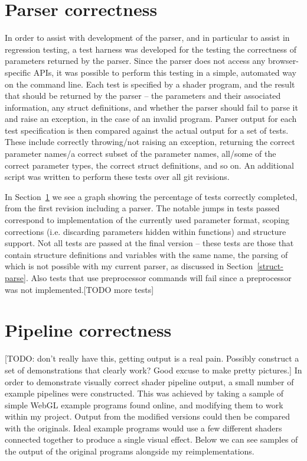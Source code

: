 \documentclass[12pt,twoside,notitlepage]{report}
\begin{document}
\section{Parser correctness}
In order to assist with development of the parser, and in particular to assist in regression testing, a test harness was developed for the testing the correctness of parameters returned by the parser. Since the parser does not access any browser-specific APIs, it was possible to perform this testing in a simple, automated way on the command line. Each test is specified by a shader program, and the result that should be returned by the parser -- the parameters and their associated information, any struct definitions, and whether the parser should fail to parse it and raise an exception, in the case of an invalid program. Parser output for each test specification is then compared against the actual output for a set of tests. These include correctly throwing/not raising an exception, returning the correct parameter names/a correct subset of the parameter names, all/some of the correct parameter types, the correct struct definitions, and so on. An additional script was written to perform these tests over all git revisions. 

In Section~\ref{parser-git} we see a graph showing the percentage of tests correctly completed, from the first revision including a parser. The notable jumps in tests passed correspond to implementation of the currently used parameter format, scoping corrections (i.e. discarding parameters hidden within functions) and structure support. Not all tests are passed at the final version -- these tests are those that contain structure definitions and variables with the same name, the parsing of which is not possible with my current parser, as discussed in Section~\ref{struct-parse}. Also tests that use preprocessor commands will fail since a preprocessor was not implemented.[TODO more tests]

\begin{figure}
\label{parser-git}
\end{figure}

\section{Pipeline correctness}
[TODO: don't really have this, getting output is a real pain. Possibly construct a set of demonstrations that clearly work? Good excuse to make pretty pictures.]
In order to demonstrate visually correct shader pipeline output, a small number of example pipelines were constructed. This was achieved by taking a sample of simple WebGL example programs found online, and modifying them to work within my project. Output from the modified versions could then be compared with the originals. Ideal example programs would use a few different shaders connected together to produce a single visual effect. Below we can see samples of the output of the original programs alongside my reimplementations.
\end{document}
